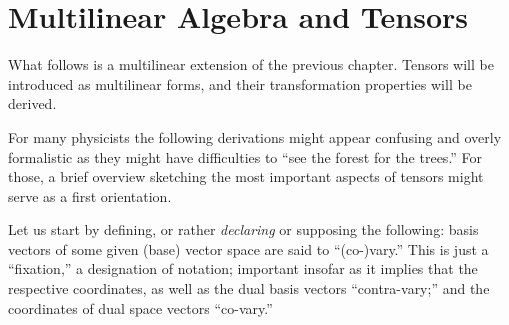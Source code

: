 \chapter{Multilinear Algebra and Tensors}
\label{ch:t}


What follows is a multilinear extension of the previous chapter.
Tensors will be introduced as multilinear forms,
and their transformation properties will be derived.


For many physicists the following derivations might appear confusing and overly formalistic
as they might have difficulties to ``see the forest for the trees.''
For those, a brief overview sketching the most important aspects of tensors might serve as a first orientation.

Let us start by defining, or rather {\em declaring} or supposing the following:  basis vectors of some given (base) vector space are said to ``(co-)vary.''
This is just a ``fixation,'' a designation of notation;
important insofar as it implies that the respective coordinates, as well as the dual basis vectors ``contra-vary;''
and the coordinates of dual space vectors ``co-vary.''

